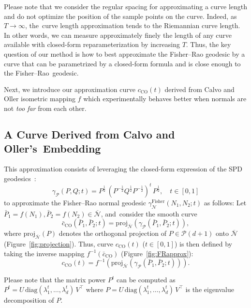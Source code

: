 \documentclass[entropy,article,accept,oneauthor,pdftex,entropy]{Definitions/mdpi}
\def\proj{\mathrm{proj}}
\def\barN{{\overline{\mathcal{N}}}}
\def\CO{\mathrm{CO}}
\def\diag{\mathrm{diag}}
\def\Fisher{\mathrm{Fisher}}
\def\calN{\mathcal{N}}
\def\calP{\mathcal{P}}
\def\barP{{\bar P}}
\begin{document}
Please note that we consider the regular spacing for approximating a curve length and do not optimize the position of the sample points on the curve.
Indeed, as~$T\rightarrow\infty$, the~curve length approximation tends to the Riemannian curve length.
In other words,  we can measure approximately finely the length of any curve available with closed-form reparameterization by increasing $T$.
Thus, the key question of our method is how to best approximate the Fisher–Rao geodesic by a curve that can be parametrized by a closed-form formula and is close enough to the Fisher--Rao~geodesic.

Next, we introduce our approximation curve $c_\CO(t)$ derived from Calvo and Oller isometric mapping $f$ which experimentally behaves better when normals are not {\it too far} from each other.

\subsection{A Curve Derived from Calvo and Oller's~Embedding}\label{sec:cocurve}
This approximation consists of leveraging the closed-form expression of the SPD geodesics~\cite{moakher2011riemannian,RieMinimax-2013}: 
$$
\gamma_\calP(P,Q;t)=P^{\frac{1}{2}} \, \left(P^{-\frac{1}{2}}Q^{\frac{1}{2}}P^{-\frac{1}{2}}\right)^t \, P^{\frac{1}{2}},
\quad t\in[0,1]
$$ 
to approximate the Fisher–Rao normal geodesic $\gamma_\calN^\Fisher(N_1,N_2;t)$ as follows:
Let $\barP_1=f(N_1),\barP_2=f(N_2)\in\barN$, and~consider the smooth curve
\begin{equation}
\bar c_\CO(\barP_1,\barP_2;t)=\proj_{\barN}\left(\gamma_\calP(\barP_1,\barP_2;t)\right),
\end{equation}
where $\proj_{\barN}(P)$ denotes the orthogonal projection of $P\in\calP(d+1)$ onto $\barN$ ({Figure}~\ref{fig:projection}).
Thus, curve $c_\CO(t)$ ($t\in[0,1]$) is then defined by taking the inverse mapping $f^{-1}(\bar c_\CO)$  (Figure~\ref{fig:FRapprox}):
\begin{equation}
c_\CO(t)=f^{-1}\left(  \proj_{\barN}\left(\gamma_\calP(\barP_1,\barP_2;t)\right)  \right).
\end{equation}

Please note that the   matrix power $P^t$ can be computed as $P^t=U\,\diag(\lambda_1^t,\ldots,\lambda_d^t)\, V^\top$ where 
$P=U\,\diag(\lambda_1^t,\ldots,\lambda_d^t)\, V^\top $ is the eigenvalue decomposition of $P$.
\end{document}
